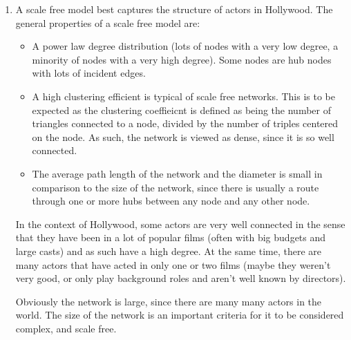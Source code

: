 \documentclass{report}
\begin{document}
\begin{enumerate}
\begin{enumerate}
    \item A scale free model best captures the structure of actors in
      Hollywood. The general properties of a scale free model are:
      \begin{itemize}
      \item A power law degree distribution (lots of nodes with a very
        low degree, a minority of nodes with a very high degree). Some
        nodes are hub nodes with lots of incident edges.
      \item A high clustering efficient is typical of scale free
        networks. This is to be expected as the clustering coeffieicnt
        is defined as being the number of triangles connected to a
        node, divided by the number of triples centered on the
        node. As such, the network is viewed as dense, since it is so
        well connected.
      \item The average path length of the network and the diameter is
        small in comparison to the size of the network, since there is
        usually a route through one or more hubs between any node and
        any other node.
      \end{itemize}
      In the context of Hollywood, some actors are very well connected
      in the sense that they have been in a lot of popular films
      (often with big budgets and large casts) and as such have a high
      degree. At the same time, there are many actors that have acted
      in only one or two films (maybe they weren't very good, or only
      play background roles and aren't well known by directors).

      Obviously the network is large, since there are many many actors
      in the world. The size of the network is an important criteria
      for it to be considered complex, and scale free.


\end{enumerate}
\end{enumerate}
\end{document}
